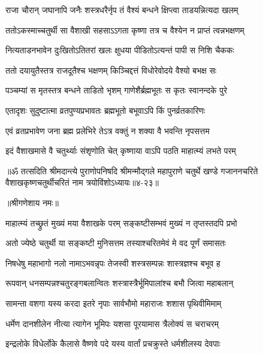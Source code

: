 \twolineshloka
{राजा चौरान् जघानापि जनैः शस्त्रधरैर्नृप}
{तं वैश्यं बन्धने क्षिप्त्वा ताडयन्नित्यदा खलम्} %

\twolineshloka
{ततोऽकस्माच्चतुर्थी सा वैशाखी सहसाऽऽगता}
{कृष्णा तत्र च वैश्येन न प्राप्तं त्वन्नभक्षणम्} %

\twolineshloka
{नित्यताडनभावेन दुःखितोऽतितरां खलः}
{क्षुधया पीडितोऽत्यन्तं पापी स निशि चैककः} %

\twolineshloka
{ततो दयायुतैस्तत्र राजदूतैश्च भक्षणम्}
{किञ्चिद्दत्तं विधोरेवोदये वैश्यो बभक्ष सः} %

\twolineshloka
{पञ्चम्यां स मृतस्तत्र बन्धने ताडितो भृशम्}
{गाणेशैर्ब्रह्मभूतः स कृतः स्वानन्दके पुरे} %

\twolineshloka
{एतादृशः सुदुष्टात्मा व्रतपुण्यप्रभावतः}
{ब्रह्मभूतो बभूवाऽपि किं पुनर्व्रतकारिणः} %

\twolineshloka
{एवं व्रतप्रभावेण जना ब्रह्म प्रलेभिरे}
{तेऽत्र वक्तुं न शक्या वै भवन्ति नृपसत्तम} %

\twolineshloka
{इदं वैशाखमासे वै चतुर्थ्याः संश‍ृणोति चेत्}
{कृष्णाया वाऽपि पठति माहात्म्यं लभते परम्} %

॥ॐ तत्सदिति श्रीमदान्त्ये पुराणोपनिषदि श्रीमन्मौद्गले महापुराणे चतुर्थे खण्डे गजाननचरिते वैशाखकृष्णचतुर्थीचरितं नाम त्रयोविंशोऽध्यायः॥४-२३॥


\label{sec:jyeshtha-krishna-chaturthi-mahatmya-varnanam}

\centerline{॥श्रीगणेशाय नमः॥}


\twolineshloka
{माहात्म्यं तच्छ्रुतं मुख्यं मया वैशाखके परम्}
{सङ्कष्टीसम्भवं मुख्यं न तृप्तस्तदपि प्रभो} %

\twolineshloka
{अतो ज्येष्ठे चतुर्थी या सङ्कष्टी मुनिसत्तम}
{तस्याश्चरितमेवं मे वद पूर्णं समासतः} %


\twolineshloka
{निषधेषु महाभागो नलो नामाऽभवन्नृपः}
{तेजस्वी शस्त्रसम्पन्नः शास्त्रज्ञश्च बभूव ह} %

\twolineshloka
{रूपवान् धनसम्पन्नश्चतुरङ्गबलान्वितः}
{शस्त्रास्त्रैर्भूमिपालांश्च बभौ जित्वा महाबलान्} %

\twolineshloka
{सामन्ता वशगा यस्य करदा इतरे नृपाः}
{सार्वभौमो महाराजः शशास पृथिवीमिमाम्} %

\twolineshloka
{धर्मेण दानशीलेन नीत्या त्यागेन भूमिपः}
{यशसा पूरयामास त्रैलोक्यं स चराचरम्} %

\twolineshloka
{इन्द्रलोके विधेर्लोके कैलासे वैष्णवे पदे}
{यस्य वार्तां प्रचक्रुस्ते धर्मशीलस्य देवपाः} %

